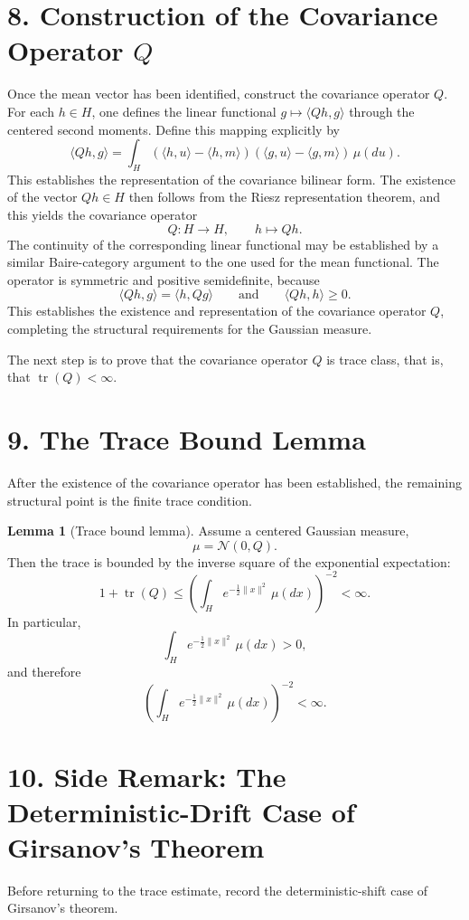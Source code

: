 \documentclass[11pt]{article}
\theoremstyle{definition}
\newtheorem{lemma}{Lemma}
\theoremstyle{remark}
\DeclareMathOperator{\tr}{tr}
\begin{document}
\section*{8. Construction of the Covariance Operator $Q$}
Once the mean vector has been identified, construct the covariance operator $Q$. For each \(h\in H\), one defines the linear functional \(g\mapsto \langle Qh,g\rangle\) through the centered second moments. Define this mapping explicitly by
\[
\langle Qh,g\rangle
=
\int_H (\langle h,u\rangle-\langle h,m\rangle)(\langle g,u\rangle-\langle g,m\rangle)\,\mu(du).
\]
This establishes the representation of the covariance bilinear form. The existence of the vector \(Qh\in H\) then follows from the Riesz representation theorem, and this yields the covariance operator
\[
Q:H\to H,
\qquad
h\mapsto Qh.
\]
The continuity of the corresponding linear functional may be established by a similar Baire-category argument to the one used for the mean functional.
The operator is symmetric and positive semidefinite, because
\[
\langle Qh,g\rangle=\langle h,Qg\rangle
\qquad \text{and} \qquad
\langle Qh,h\rangle\ge 0.
\]
This establishes the existence and representation of the covariance operator $Q$, completing the structural requirements for the Gaussian measure.

The next step is to prove that the covariance operator $Q$ is trace class, that is, that \(\tr(Q)<\infty\).

\section*{9. The Trace Bound Lemma}
After the existence of the covariance operator has been established, the remaining structural point is the finite trace condition.

\begin{lemma}[Trace bound lemma]
Assume a centered Gaussian measure,
\[
\mu=\mathcal N(0,Q).
\]
Then the trace is bounded by the inverse square of the exponential expectation:
\[
1+\tr(Q)\le \left(\int_H e^{-\frac{1}{2}\|x\|^2}\,\mu(dx)\right)^{-2}<\infty.
\]
In particular,
\[
\int_H e^{-\frac{1}{2}\|x\|^2}\,\mu(dx)>0,
\]
and therefore
\[
\left(\int_H e^{-\frac{1}{2}\|x\|^2}\,\mu(dx)\right)^{-2}<\infty.
\]
\end{lemma}

\section*{10. Side Remark: The Deterministic-Drift Case of Girsanov's Theorem}
Before returning to the trace estimate, record the deterministic-shift case of Girsanov's theorem.
\end{document}
